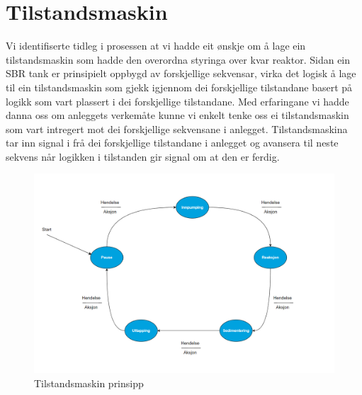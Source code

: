 \section{Tilstandsmaskin}
\thispagestyle{fancy}

Vi identifiserte tidleg i prosessen at vi hadde eit ønskje om å lage ein tilstandsmaskin som hadde den 
overordna styringa over kvar reaktor. 
Sidan ein SBR tank er prinsipielt oppbygd av forskjellige sekvensar, virka det logisk å lage til ein 
tilstandsmaskin som gjekk igjennom dei forskjellige tilstandane basert på logikk som vart plassert i dei forskjellige tilstandane. 
Med erfaringane vi hadde danna oss om anleggets verkemåte 
kunne vi enkelt tenke oss ei tilstandsmaskin som vart intregert mot dei forskjellige sekvensane i anlegget. 
Tilstandsmaskina tar inn signal i frå dei forskjellige tilstandane i anlegget og avansera til neste 
sekvens når logikken i tilstanden gir signal om at den er ferdig. 


\begin{figure}[htbp]
    \centering
    \includegraphics[width=1\textwidth]{Figurar/Tom tilstandsmaskin.png}
    \caption{Tilstandsmaskin prinsipp}\label{fig:Tilstandsmaskin prinsipp}    
\end{figure}

\newpage

